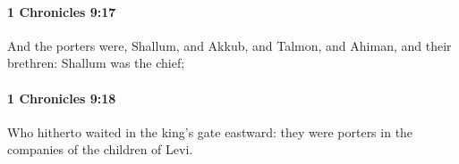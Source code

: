 		\paragraph{1 Chronicles 9:17} %
			\label{1CHRONICLES-9-17}

			And the porters were, Shallum, and Akkub, and Talmon, and Ahiman, and their brethren: Shallum was the chief;


		\paragraph{1 Chronicles 9:18} %
			\label{1CHRONICLES-9-18}

			Who hitherto waited in the king’s gate eastward: they were porters in the companies of the children of Levi.


